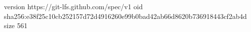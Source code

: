 version https://git-lfs.github.com/spec/v1
oid sha256:e38f25c10cb252157d72d4916260e99b0bad42ab66d8620b736918443cf2ab4d
size 561
